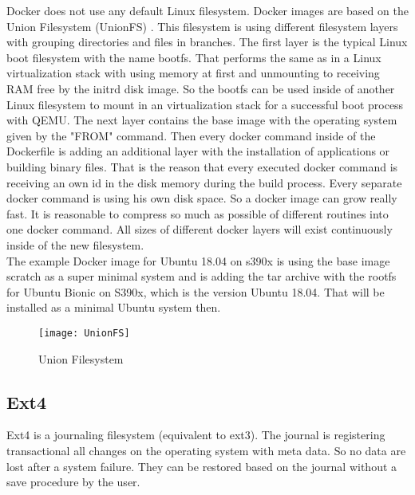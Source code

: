 Docker does not use any default Linux filesystem. 
Docker images are based on the Union Filesystem (UnionFS) \cite[~p.21]{Ashraf2015}. 
This filesystem is using different filesystem layers with grouping directories and files in branches. 
The first layer is the typical Linux boot filesystem with the name bootfs. 
That performs the same as in a Linux virtualization stack with using memory at first and unmounting to receiving RAM free by the initrd disk image. 
So the bootfs can be used inside of another Linux filesystem to mount in an virtualization stack for a successful boot process with QEMU.
The next layer contains the base image with the operating system given by the "FROM" command.
Then every docker command inside of the Dockerfile is adding an additional layer with the installation of applications or building binary files.
That is the reason that every executed docker command is receiving an own id in the disk memory during the build process.
Every separate docker command is using his own disk space. So a docker image can grow really fast.
It is reasonable to compress so much as possible of different routines into one docker command. 
All sizes of different docker layers will exist continuously inside of the new filesystem. \\
The example Docker image for Ubuntu 18.04 on s390x is using the base image scratch as a super minimal system and is adding the tar archive with the rootfs for Ubuntu Bionic on S390x, which is the version Ubuntu 18.04. That will be installed as a minimal Ubuntu system then.

\begin{figure}[H]
\centering
\texttt{[image: UnionFS]}
 \caption{Union Filesystem}
    \label{UnionFilesytem}
\end{figure}

\subsection{Ext4}

Ext4 is a journaling filesystem (equivalent to ext3). The journal is registering transactional all changes on the operating system with meta data.
So no data  are lost after a system failure. They can be restored based on the journal without a save procedure by the user.

